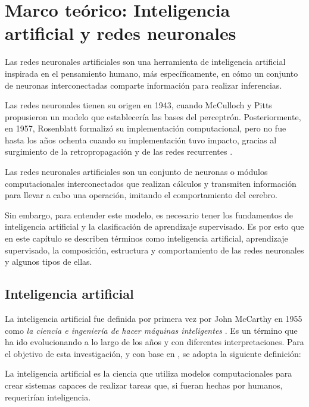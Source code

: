 \chapter{Marco teórico: Inteligencia artificial y redes neuronales}

Las redes neuronales artificiales son una herramienta de inteligencia artificial inspirada en el pensamiento humano, más específicamente, en cómo un conjunto de neuronas interconectadas comparte información para realizar inferencias. 	

Las redes neuronales tienen su origen en 1943, cuando McCulloch y Pitts propusieron un modelo que establecería las bases del perceptrón. Posteriormente, en 1957, Rosenblatt formalizó su implementación computacional, pero no fue hasta los años ochenta cuando su implementación tuvo impacto, gracias al surgimiento de la retropropagación y de las redes recurrentes \cite{matich2001_ann}.

Las redes neuronales artificiales son un conjunto de neuronas o módulos computacionales interconectados que realizan cálculos y transmiten información para llevar a cabo una operación, imitando el comportamiento del cerebro.

Sin embargo, para entender este modelo, es necesario tener los fundamentos de inteligencia artificial y la clasificación de aprendizaje supervisado. Es por esto que en este capítulo se describen términos como inteligencia artificial, aprendizaje supervisado, la composición, estructura y comportamiento de las redes neuronales y algunos tipos de ellas. 

\section{Inteligencia artificial}

La inteligencia artificial fue definida por primera vez por John McCarthy en 1955 como \textit{la ciencia e ingeniería de hacer máquinas inteligentes} \cite{Manning2020_ai}. Es un término que ha ido evolucionando a lo largo de los años y con diferentes interpretaciones. Para el objetivo de esta investigación, y con base en \cite{Manning2020_ai, google2025_ai, mccarthy2007_ai}, se adopta la siguiente definición:

\begin{definition}
	La inteligencia artificial es la ciencia que utiliza modelos computacionales para crear sistemas capaces de realizar tareas que, si fueran hechas por humanos, requerirían inteligencia.
\end{definition}

